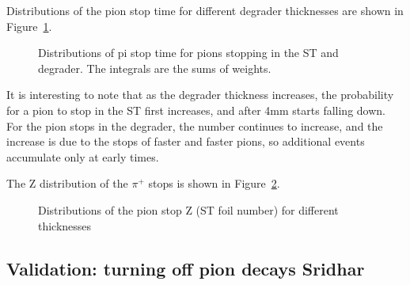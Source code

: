 Distributions of the pion stop time for different degrader thicknesses are shown in Figure~\ref{fig:pion_stop_time}.
\begin{figure}[H]
  \caption{
    \label{fig:pion_stop_time}
    Distributions of pi stop time for pions stopping in the ST and degrader. The integrals are the sums of weights.
  }
\end{figure}

It is interesting to note that as the degrader thickness increases, the probability for a pion to stop
in the ST first increases, and after 4mm starts falling down. 
For the pion stops in the degrader, the number continues to increase, and the increase is due
to the stops of faster and faster pions, so additional events accumulate only at early times.

The Z distribution of the $\pi^+$ stops is shown in Figure~\ref{fig:pion_stop_foil}.

\begin{figure}[H]
  \caption{
    \label{fig:pion_stop_foil}
    Distributions of the pion stop Z (ST foil number) for different thicknesses
  }
\end{figure}

\newpage
\subsection {{\red Validation: turning off pion decays  Sridhar}}

